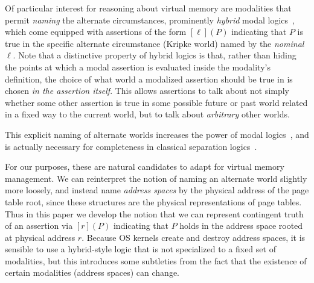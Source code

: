 
Of particular interest for reasoning about virtual memory are modalities that permit \emph{naming} the alternate 
circumstances, prominently \emph{hybrid} modal logics~\cite{blackburn1995hybrid,areces2001hybrid}, which come equipped 
with assertions of the form $[\ell](P)$ indicating that $P$ is true in the specific alternate circumstance (Kripke world)
 named by the \emph{nominal} $\ell$. Note that a distinctive property of hybrid logics is that, rather than hiding
the points at which a modal assertion is evaluated inside the modality's definition, the choice of what world a modalized
assertion should be true in is chosen \emph{in the assertion itself}. This allows assertions to talk about not simply whether some other assertion
is true in some possible future or past world related in a fixed way to the current world, but to talk about \emph{arbitrary}
other worlds.

This explicit naming of alternate worlds increases the power of modal logics~\cite{blackburn1995hybrid}, and is actually
necessary for completeness in classical separation logics~\cite{brotherston2014parametric}.

For our purposes, these are natural candidates to adapt for virtual memory management. We can reinterpret the notion of 
naming an alternate world slightly more loosely, and instead name \emph{address spaces} by the physical address of the 
page table root, since these structures are the physical representations of page tables. Thus in this paper we develop 
the notion that we can represent contingent truth of an assertion via $[r](P)$ indicating that $P$ holds in the address 
space rooted at physical address $r$. Because OS kernels create and destroy address spaces, it is sensible to use
a hybrid-style logic that is not specialized to a fixed set of modalities, but this introduces
some subtleties from the fact that the existence of certain modalities (address spaces) can change.

